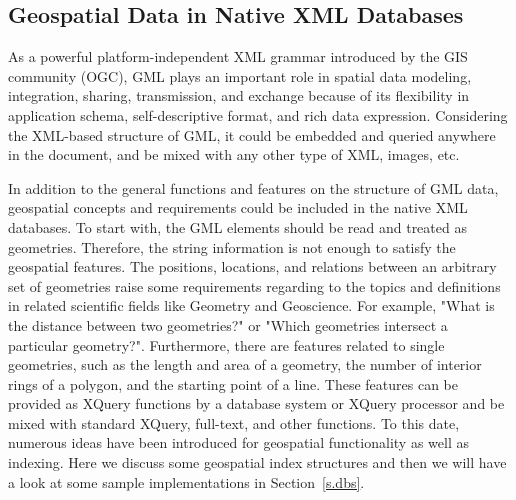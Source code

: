 \documentclass[a4paper,12pt]{article}
\begin{document}
\subsection{Geospatial Data in Native XML Databases}
\label{s.geo-data-in-xml-data}
As a powerful platform-independent XML grammar introduced by the GIS community (OGC), GML plays an important role in spatial data modeling, integration, sharing, transmission, and exchange because of its flexibility in application schema, self-descriptive format, and rich data expression. Considering the XML-based structure of GML, it could be embedded and queried anywhere in the document, and be mixed with any other type of XML, images, etc. 

In addition to the general functions and features on the structure of GML data, geospatial concepts and requirements could be included in the native XML databases. To start with, the GML elements should be read and treated as geometries. Therefore, the string information is not enough to satisfy the geospatial features. The positions, locations, and relations between an arbitrary set of geometries raise some requirements regarding to the topics and definitions in related scientific fields like Geometry and Geoscience. For example, "What is the distance between two geometries?" or "Which geometries intersect a particular geometry?". Furthermore, there are features related to single geometries, such as the length and area of a geometry, the number of interior rings of a polygon, and the starting point of a line. These features can be provided as XQuery functions by a database system or XQuery processor and be mixed with standard XQuery, full-text, and other functions.
To this date, numerous ideas have been introduced for geospatial functionality as well as indexing. Here we discuss some geospatial index structures and then we will have a look at some sample implementations in Section~\ref{s.dbs}.


\end{document}
